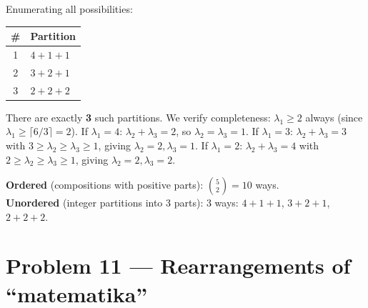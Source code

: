 \documentclass[12pt, a4paper]{article}
\begin{document}
Enumerating all possibilities:

\begin{center}
\renewcommand{\arraystretch}{1.15}
\begin{tabular}{cl}
\toprule
\textbf{\#} & \textbf{Partition} \\
\midrule
1 & $4 + 1 + 1$ \\
2 & $3 + 2 + 1$ \\
3 & $2 + 2 + 2$ \\
\bottomrule
\end{tabular}
\end{center}

There are exactly \textbf{3} such partitions. We verify completeness:
$\lambda_1 \ge 2$ always (since $\lambda_1 \ge \lceil 6/3\rceil = 2$).
If $\lambda_1 = 4$: $\lambda_2+\lambda_3=2$, so $\lambda_2=\lambda_3=1$.
If $\lambda_1 = 3$: $\lambda_2+\lambda_3=3$ with $3 \ge \lambda_2 \ge \lambda_3 \ge 1$,
giving $\lambda_2=2, \lambda_3=1$.
If $\lambda_1 = 2$: $\lambda_2+\lambda_3=4$ with $2 \ge \lambda_2 \ge \lambda_3 \ge 1$,
giving $\lambda_2=2, \lambda_3=2$.

\begin{answerbox}
\centering
\textbf{Ordered} (compositions with positive parts):
$\displaystyle\binom{5}{2} = 10$ ways.\\[4pt]
\textbf{Unordered} (integer partitions into 3 parts):
$3$ ways: \;$4{+}1{+}1$,\; $3{+}2{+}1$,\; $2{+}2{+}2$.
\end{answerbox}

\newpage
\section{Problem 11 --- Rearrangements of ``matematika''}
\end{document}
